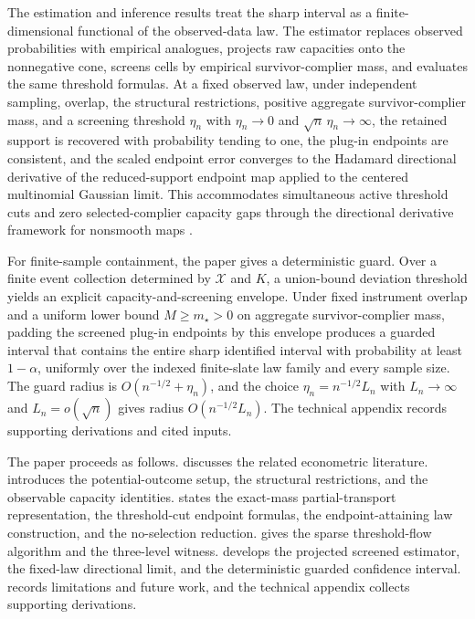 The estimation and inference results treat the sharp interval as a finite-dimensional functional of the observed-data law.  The estimator replaces observed probabilities with empirical analogues, projects raw capacities onto the nonnegative cone, screens cells by empirical survivor-complier mass, and evaluates the same threshold formulas.  At a fixed observed law, under independent sampling, overlap, the structural restrictions, positive aggregate survivor-complier mass, and a screening threshold \(\eta_n\) with \(\eta_n\to0\) and \(\sqrt n\,\eta_n\to\infty\), the retained support is recovered with probability tending to one, the plug-in endpoints are consistent, and the scaled endpoint error converges to the Hadamard directional derivative of the reduced-support endpoint map applied to the centered multinomial Gaussian limit.  This accommodates simultaneous active threshold cuts and zero selected-complier capacity gaps through the directional derivative framework for nonsmooth maps \citep{vanDerVaart1998,FangSantos2019,HongLi2018}.

For finite-sample containment, the paper gives a deterministic guard.  Over a finite event collection determined by \(\mathcal X\) and \(K\), a union-bound deviation threshold yields an explicit capacity-and-screening envelope.  Under fixed instrument overlap and a uniform lower bound \(M\ge m_\star>0\) on aggregate survivor-complier mass, padding the screened plug-in endpoints by this envelope produces a guarded interval that contains the entire sharp identified interval with probability at least \(1-\alpha\), uniformly over the indexed finite-slate law family and every sample size.  The guard radius is \(O(n^{-1/2}+\eta_n)\), and the choice \(\eta_n=n^{-1/2}L_n\) with \(L_n\to\infty\) and \(L_n=o(\sqrt n)\) gives radius \(O(n^{-1/2}L_n)\).  The technical appendix records supporting derivations and cited inputs.

The paper proceeds as follows.   discusses the related econometric literature.   introduces the potential-outcome setup, the structural restrictions, and the observable capacity identities.   states the exact-mass partial-transport representation, the threshold-cut endpoint formulas, the endpoint-attaining law construction, and the no-selection reduction.   gives the sparse threshold-flow algorithm and the three-level witness.   develops the projected screened estimator, the fixed-law directional limit, and the deterministic guarded confidence interval.   records limitations and future work, and the technical appendix collects supporting derivations.
